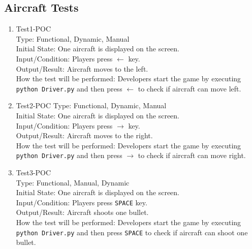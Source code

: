 \documentclass[12pt]{article}
\begin{document}
\subsection{Aircraft Tests}
\begin{enumerate}[1.]
\item Test1-POC\\
Type: Functional, Dynamic, Manual\\
Initial State: One aircraft is displayed on the screen.\\
Input/Condition: Players press $\leftarrow$ key.\\
Output/Result: Aircraft moves to the left.\\
How the test will be performed: Developers start the 
game by executing \verb|python Driver.py| and then press
$\leftarrow$ to check if aircraft can move left.
\item Test2-POC
Type: Functional, Dynamic, Manual\\
Initial State: One aircraft is displayed on the screen.\\
Input/Condition: Players press $\rightarrow$ key.\\
Output/Result: Aircraft moves to the right.\\
How the test will be performed: Developers start the 
game by executing \verb|python Driver.py| and then press
$\rightarrow$ to check if aircraft can move right.
\item Test3-POC\\
Type: Functional, Manual, Dynamic\\
Initial State: One aircraft is displayed on the screen.\\
Input/Condition: Players press \verb|SPACE| key.\\
Output/Result: Aircraft shoots one bullet.\\
How the test will be performed: Developers start the 
game by executing \verb|python Driver.py| and then press
\verb|SPACE| to check if aircraft can shoot one bullet.
\end{enumerate}
\end{document}
